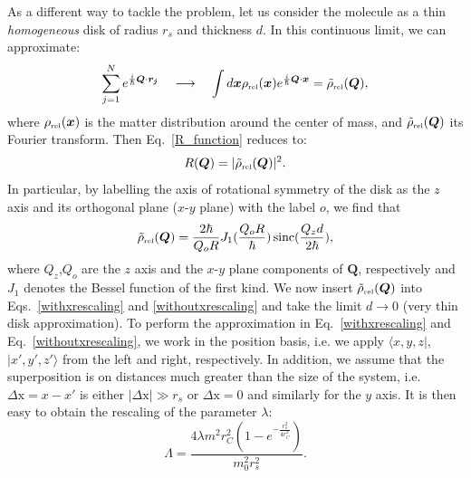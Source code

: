 \documentclass[12pt,groupedaddress,pra,aps]{revtex4-1}
\DeclareMathOperator\sinc{sinc}
\begin{document}
As a different way to tackle the problem, let us consider the molecule as a thin \textit{homogeneous} disk of radius $r_s$ and thickness $d$. In this continuous limit, we can approximate:
\begin{equation}
\sum_{j=1}^{N} e^{\frac{i}{\hbar} \bm{Q} \cdot \bm{r_j}}  \quad \longrightarrow \quad  \int d\bm{x} \rho_{\text{\tiny rel}}(\bm{x}) e^{\frac{i}{\hbar} \bm{Q} \cdot \bm{x}} = \tilde{\rho}_{\text{\tiny rel}}(\bm{Q}),
\end{equation}
where $\rho_{\text{\tiny rel}}(\bm{x}) $ is the matter distribution around the center of mass, and $\tilde{\rho}_{\text{\tiny rel}}(\bm{Q})$ its Fourier transform. Then Eq.~\eqref{R_function} reduces to:
\begin{equation}\label{homogeneousR}
R(\bm{Q})= |\tilde{\rho}_{\text{\tiny rel}}(\bm{Q})|^2.
\end{equation}
In particular, by labelling the axis of rotational symmetry of the disk as the $z$ axis and its orthogonal plane ($x$-$y$ plane) with the label $o$, we find that 
\begin{equation}
\tilde{\rho}_{\text{\tiny rel}}(\bm{Q})=\frac{2\hbar}{Q_o R} J_1(\frac{Q_o R}{\hbar}) \sinc(\frac{Q_z d}{2 \hbar}),
\end{equation} 
where $Q_z$,$Q_o$ are the $z$ axis and the $x$-$y$ plane components of $\bm{Q}$, respectively and $J_1$ denotes the Bessel function of the first kind. We now insert $\tilde{\rho}_{\text{\tiny rel}}(\bm{Q})$ into Eqs.~\eqref{withxrescaling} and \eqref{withoutxrescaling} and take the limit $d \rightarrow 0$ (very thin disk approximation). To perform the approximation in Eq.~\eqref{withxrescaling} and Eq.~\eqref{withoutxrescaling}, we work in the position basis, i.e. we apply $\langle x, y, z |$, $|x', y', z'\rangle$ from the left and right, respectively. In addition, we assume that the superposition is on distances much greater than the size of the system, i.e. $\text{$\Delta $x} = x-x'$ is either $|\text{$\Delta $x}|\gg r_s$ or $\text{$\Delta $x}=0$ and similarly for the $y$ axis. It is then easy to obtain the rescaling of the parameter $\lambda$:
\begin{equation}
\Lambda=\frac{4 \lambda m^2 r_C^2 \left(1-e^{-\frac{r_s^2}{4 r_C^2}}\right)}{m_0^2 r_s^2}.
\end{equation}\\ 
\end{document}
